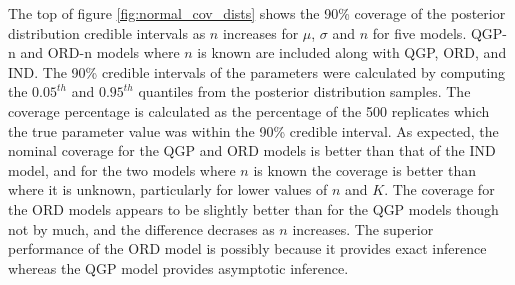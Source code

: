 \documentclass[preprint,12pt,authoryear]{elsarticle}
\newcommand{\1}[1]{\mathds{1}\left[#1\right]}
\begin{document}
% 


The top of figure \ref{fig:normal_cov_dists} shows the 90\% coverage of 
the posterior distribution credible intervals as $n$ increases for 
$\mu$, $\sigma$ and $n$ for five models. QGP-n and ORD-n models where $n$ is 
known are included along with QGP, ORD, and IND. 
The 90\% credible intervals of the 
parameters were calculated by computing the $0.05^{th}$ and $0.95^{th}$ 
quantiles from the posterior distribution samples. The coverage percentage is 
calculated as the percentage of the 500 replicates which the true parameter 
value was within the 90\% credible interval.
As expected, the nominal coverage for the QGP and ORD models is better than 
that of the IND model, and for the two models where $n$ is known the coverage 
is better than where it is unknown, particularly for lower values of 
$n$ and $K$. The coverage for the ORD models appears to be slightly better 
than for the QGP models though not by much, and the difference
decrases as $n$ increases. 
The superior performance of the ORD model is possibly because it
provides exact inference 
whereas the QGP model provides asymptotic inference.
\end{document}
